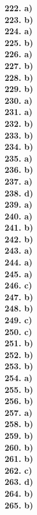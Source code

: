 \documentclass[8pt]{extarticle}
\begin{document}
\begin{multicols}{8}
\textbf{222. a)} \\
\textbf{223. b)} \\
\textbf{224. a)} \\
\textbf{225. b)} \\
\textbf{226. a)} \\
\textbf{227. b)} \\
\textbf{228. b)} \\
\textbf{229. b)} \\
\textbf{230. a)} \\
\textbf{231. a)} \\
\textbf{232. b)} \\
\textbf{233. b)} \\
\textbf{234. b)} \\
\textbf{235. a)} \\
\textbf{236. b)} \\
\textbf{237. a)} \\
\textbf{238. d)} \\
\textbf{239. a)} \\
\textbf{240. a)} \\
\textbf{241. b)} \\
\textbf{242. b)} \\
\textbf{243. a)} \\
\textbf{244. a)} \\
\textbf{245. a)} \\
\textbf{246. c)} \\
\textbf{247. b)} \\
\textbf{248. b)} \\
\textbf{249. c)} \\
\textbf{250. c)} \\
\textbf{251. b)} \\
\textbf{252. b)} \\
\textbf{253. b)} \\
\textbf{254. a)} \\
\textbf{255. b)} \\
\textbf{256. b)} \\
\textbf{257. a)} \\
\textbf{258. b)} \\
\textbf{259. b)} \\
\textbf{260. b)} \\
\textbf{261. b)} \\
\textbf{262. c)} \\
\textbf{263. d)} \\
\textbf{264. b)} \\
\textbf{265. b)} \\

\end{multicols}
\end{document}
